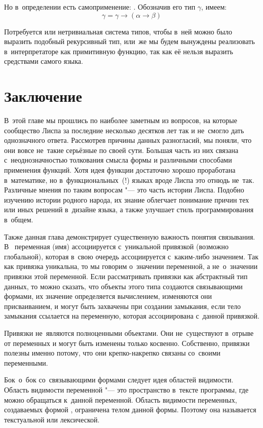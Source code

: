 Но в~определении  есть самоприменение: . Обозначив его тип
$\gamma$, имеем:
%
\[ \gamma = \gamma \to (\alpha \to \beta) \]

Потребуется или нетривиальная система типов, чтобы в~ней можно было выразить
подобный рекурсивный тип, или~же мы будем вынуждены реализовать 
в~интерпретаторе как примитивную функцию, так как её нельзя выразить средствами
самого языка.


\section{Заключение}\label{lisp1-2-omega/sect:conclusions}

В~этой главе мы прошлись по наиболее заметным из вопросов, на которые сообщество
Лиспа за последние несколько десятков лет так и не~смогло дать однозначного
ответа. Рассмотрев причины данных разногласий, мы поняли, что они вовсе не~такие
серьёзные по своей сути. Большая часть из них связана с~неоднозначностью
толкования смысла формы  и различными способами применения функций.
Хотя идея функции достаточно хорошо проработана в~математике, но
в~функциональных~(!) языках вроде Лиспа это отнюдь не~так. Различные мнения по
таким вопросам "--- это часть истории Лиспа. Подобно изучению истории родного
народа, их знание облегчает понимание причин тех или иных решений в~дизайне
языка, а также улучшает стиль программирования в~общем.

Также данная глава демонстрирует существенную важность понятия связывания.
В~ переменная (имя) ассоциируется с~уникальной привязкой (возможно
глобальной), которая в~свою очередь ассоциируется с~каким-либо значением. Так
как привязка уникальна, то мы говорим о~значении переменной, а не~о~значении
привязки этой переменной. Если рассматривать привязки как абстрактный тип
данных, то можно сказать, что объекты этого типа создаются связывающими формами,
их значение определяется вычислением, изменяются они присваиванием, и могут быть
захвачены при создании замыкания, если тело замыкания ссылается на переменную,
которая ассоциирована с~данной привязкой.

Привязки не~являются полноценными объектами. Они не~существуют в~отрыве от
переменных и могут быть изменены только косвенно. Собственно, привязки полезны
именно потому, что они крепко-накрепко связаны со~своими переменными.

Бок~о~бок со~связывающими формами следует идея областей видимости. Область
видимости переменной "--- это пространство в~тексте программы, где можно
обращаться к~данной переменной. Область видимости переменных, создаваемых
формой , ограничена телом данной формы. Поэтому она называется
текстуальной или лексической.

